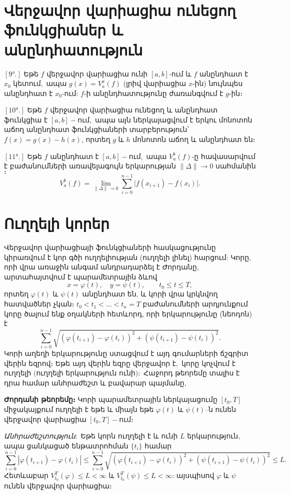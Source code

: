 \documentclass[12pt]{article}
\begin{document}
\section{Վերջավոր վարիացիա ունեցող ֆունկցիաներ և անընդհատություն}
\begin{description}
\item\([9°.]\) Եթե \(f\) վերջավոր վարիացիա ունի \([a,b]\)-ում և \(f\) անընդհատ է \(x_0\) կետում\(,\) ապա \(g(x)=V_a^x(f)\) (լրիվ վարիացիա \(x\)-ին) նույնպես անընդհատ է \(x_0\)-ում: \(f\)-ի անընդհատությունը ժառանգվում է \(g\)-ին։
\item\([10°.]\) Եթե \(f\) վերջավոր վարիացիա ունեցող և անընդհատ ֆունկցիա է \([a,b]-\)ում\(,\) ապա այն ներկայացվում է երկու մոնոտոն աճող անընդհատ ֆունկցիաների տարբերություն՝ \(f(x) = g(x)-h(x)\), որտեղ \(g\) և \(h\) մոնոտոն աճող և անընդհատ են։
\item\([11°.]\) Եթե \(f\) անընդհատ է \([a,b]-\)ում\(,\) ապա \(V_a^b(f)\)-ը հավասարվում է բաժանումների առավելագույն երկարության \(\|\Delta\|\to0\) սահմանին\(։\)
\[
V_a^b(f) = \lim_{\|\Delta\|\to0} \sum_{i=0}^{n-1}\bigl|f(x_{i+1}) - f(x_i)\bigr|.
\]
\end{description}

\section{Ուղղելի կորեր}
Վերջավոր վարիացիայի ֆունկցիաների հասկացությունը կիրառվում է կոր գծի ուղղելիության (ուղղելի լինել) հարցում: Կորը, որի վրա առաջին անգամ անդրադարձել է Ժորդանը, արտահայտվում է պարամետրային ձևով
\begin{equation}\label{eq:curve-param}
x = \varphi(t),\quad y = \psi(t),\qquad t_0 \le t \le T,
\end{equation}
որտեղ \(\varphi(t)\) և \(\psi(t)\) անընդհատ են, և կորի վրա կրկնվող հատվածներ չկան։ \(t_0 < t_1 < \dots < t_n=T\) բաժանումների արդյունքում կորը ծալում ենք օղակների հետևորդ, որի երկարությունը (նեոդոն) է
\[
\sum_{i=0}^{n-1} \sqrt{(\varphi(t_{i+1})-\varphi(t_i))^2 + (\psi(t_{i+1})-\psi(t_i))^2}.
\]
Կորի աղեղի երկարությունը ստացվում է այդ գումարների ճշգրիտ վերին եզրով։ Եթե այդ վերին եզրը վերջավոր է\(,\) կորը կոչվում է ուղղելի \((\)ուղղելի երկարություն ունի\():\) Հաջորդ թեորեմը տալիս է դրա համար անհրաժեշտ և բավարար պայմանը\(,\)

\textbf{Ժորդանի թեորեմը։} Կորի պարամետրային ներկայացումը \([t_0,T]\) միջակայքում ուղղելի է եթե և միայն եթե \(\varphi(t)\) և \(\psi(t)\)–ն ունեն վերջավոր վարիացիա \([t_0,T]-\)ում։

\textit{Անհրաժեշտություն\(:\)} Եթե կորն ուղղելի է և ունի \(L\) երկարություն\(,\) ապա ցանկացած ենթատրոհման \(\{t_i\}\) համար
\[
\sum_{i=0}^{n-1}|\varphi(t_{i+1})-\varphi(t_i)|
\le \sum_{i=0}^{n-1}\sqrt{(\varphi(t_{i+1})-\varphi(t_i))^2+(\psi(t_{i+1})-\psi(t_i))^2} \le L.
\]
Հետևաբար \(V_{t_0}^{T}(\varphi)\le L<\infty\) և \(V_{t_0}^{T}(\psi)\le L<\infty\): այսպիսով \(\varphi\) և \(\psi\) ունեն վերջավոր վարիացիա։
\end{document}
